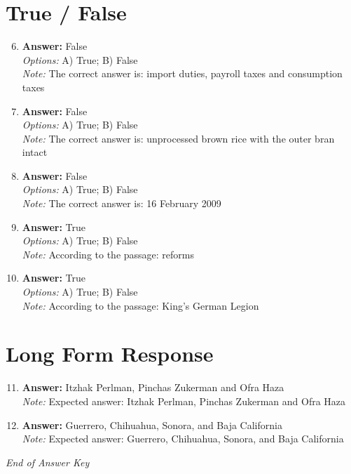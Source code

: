 \documentclass[12pt]{article}
\begin{document}
\section*{True / False}
\begin{enumerate}[label=\arabic*.]
\setcounter{enumi}{5}
\item \textbf{Answer:} False
\\ \textit{Options:} A) True; B) False
\\ \textit{Note:} The correct answer is: import duties, payroll taxes and consumption taxes
\item \textbf{Answer:} False
\\ \textit{Options:} A) True; B) False
\\ \textit{Note:} The correct answer is: unprocessed brown rice with the outer bran intact
\item \textbf{Answer:} False
\\ \textit{Options:} A) True; B) False
\\ \textit{Note:} The correct answer is: 16 February 2009
\item \textbf{Answer:} True
\\ \textit{Options:} A) True; B) False
\\ \textit{Note:} According to the passage: reforms
\item \textbf{Answer:} True
\\ \textit{Options:} A) True; B) False
\\ \textit{Note:} According to the passage: King's German Legion
\end{enumerate}

\section*{Long Form Response}
\begin{enumerate}[label=\arabic*.]
\setcounter{enumi}{10}
\item \textbf{Answer:} Itzhak Perlman, Pinchas Zukerman and Ofra Haza
\\ \textit{Note:} Expected answer: Itzhak Perlman, Pinchas Zukerman and Ofra Haza
\item \textbf{Answer:} Guerrero, Chihuahua, Sonora, and Baja California
\\ \textit{Note:} Expected answer: Guerrero, Chihuahua, Sonora, and Baja California
\end{enumerate}

\vfill
\noindent\textit{End of Answer Key}
\end{document}
